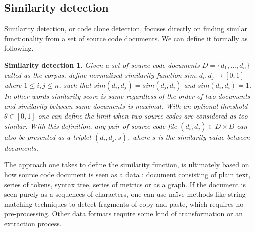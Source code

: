 \subsection{Similarity detection} \label{chap-sd}

Similarity detection, or code clone detection, focuses directly on finding similar functionality from a set of source code documents. We can define it formally as following.

\newtheorem*{smd1}{Similarity detection}

\begin{smd1}
Given a set of source code documents $D = \{d_1,...,d_n\}$ called as the corpus, define normalized similarity function $sim: d_i, d_j \rightarrow [0, 1]$ where $1 \leq i, j \leq n$, such that $sim(d_i, d_j) = sim(d_j, d_i)$ and $sim(d_i, d_i) = 1$. In other words similarity score is same regardless of the order of two documents and similarity between same documents is maximal. With an optional threshold $\theta \in [0, 1]$ one can define the limit when two source codes are considered as too similar. With this definition, any pair of source code file $(d_i, d_j) \in D \times D$ can also be presented as a triplet $(d_i, d_j, s)$, where $s$ is the similarity value between documents. 
\end{smd1}


The approach one takes to define the similarity function, is ultimately based on how source code document is seen as a data \cite{Roy:2009:CEC:1530898.1531101}: document consisting of plain text, series of tokens, syntax tree, series of metrics or as a graph. If the document is seen purely as a sequences of characters, one can use naïve methods like string matching techniques to detect fragments of copy and paste, which requires no pre-processing. Other data formats require some kind of transformation or an extraction process. 


